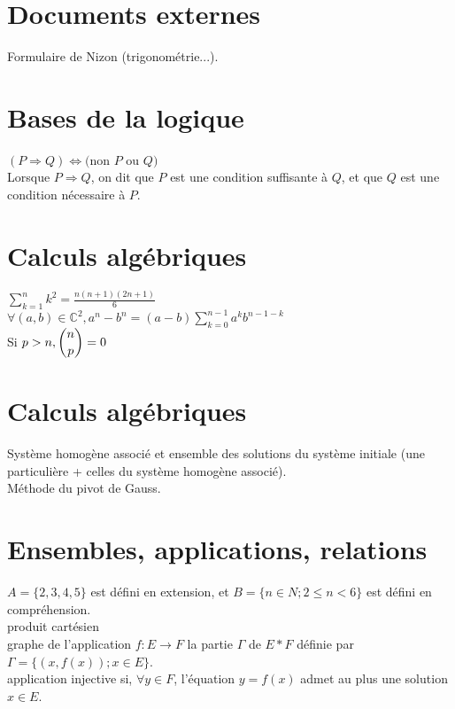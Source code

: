 \documentclass{article}
\begin{document}
	\section{Documents externes}
	
		Formulaire de Nizon (trigonométrie...).

	\section{Bases de la logique}
		
		$(P \Rightarrow Q) \Leftrightarrow ($non $P$ ou $Q)$\\
	
		Lorsque $P \Rightarrow Q$, on dit que $P$ est une condition suffisante à $Q$, et que $Q$ est une condition nécessaire à $P$.
		
	\section{Calculs algébriques}
	
		$\sum_{k=1}^{n} k^2 = \frac{n(n+1)(2n+1)}{6}$\\
		$\forall (a, b) \in \mathbb{C}^2, a^n - b^n = (a-b)\sum_{k=0}^{n-1}a^kb^{n-1-k}$\\
		Si $p > n, \dbinom{n}{p} = 0$
		
	\section{Calculs algébriques}
	
		Système homogène associé et ensemble des solutions du système initiale (une particulière + celles du système homogène associé).\\
		Méthode du pivot de Gauss.
		
	\section{Ensembles, applications, relations}
		
		$A = \{2, 3, 4, 5\}$ est défini en extension, et $B = \{n \in N; 2 \leq n < 6\}$ est défini en compréhension.\\
		produit cartésien\\
		graphe de l'application $f:E \rightarrow F$ la partie $\Gamma$ de $E*F$ définie par
$\Gamma = \{(x, f(x)); x \in E\}$.\\
		application injective si, $\forall y \in F$, l'équation $y = f(x)$ admet au plus une solution $x \in E$.\\
		
\end{document}
